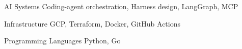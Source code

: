 

\begin{cvskills}

    

 \cvskill
    {AI Systems} %
    {Coding-agent orchestration, Harness design, LangGraph, MCP} %

  \cvskill
    {Infrastructure} %
    {GCP, Terraform, Docker, GitHub Actions} %
    
  \cvskill
    {Programming Languages} %
    {Python, Go} %


    


\end{cvskills}
